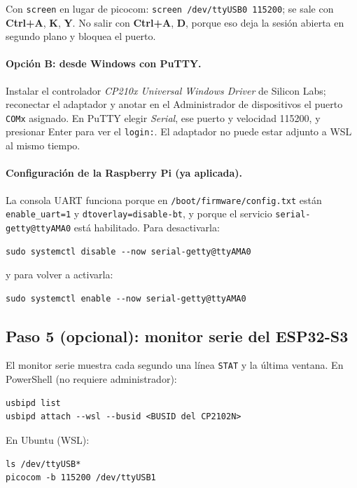 \documentclass[12pt,a4paper]{article}
\begin{document}
Con \texttt{screen} en lugar de picocom: \texttt{screen /dev/ttyUSB0 115200}; se sale con \textbf{Ctrl+A}, \textbf{K}, \textbf{Y}. No salir con \textbf{Ctrl+A}, \textbf{D}, porque eso deja la sesión abierta en segundo plano y bloquea el puerto.

\paragraph{Opción B: desde Windows con PuTTY.} Instalar el controlador \emph{CP210x Universal Windows Driver} de Silicon Labs; reconectar el adaptador y anotar en el Administrador de dispositivos el puerto \texttt{COMx} asignado. En PuTTY elegir \emph{Serial}, ese puerto y velocidad 115200, y presionar Enter para ver el \texttt{login:}. El adaptador no puede estar adjunto a WSL al mismo tiempo.

\paragraph{Configuración de la Raspberry Pi (ya aplicada).} La consola UART funciona porque en \texttt{/boot/firmware/config.txt} están \texttt{enable\_uart=1} y \texttt{dtoverlay=disable-bt}, y porque el servicio \texttt{serial-getty@ttyAMA0} está habilitado. Para desactivarla:
\begin{verbatim}
sudo systemctl disable --now serial-getty@ttyAMA0
\end{verbatim}
y para volver a activarla:
\begin{verbatim}
sudo systemctl enable --now serial-getty@ttyAMA0
\end{verbatim}

\subsection{Paso 5 (opcional): monitor serie del ESP32-S3}

El monitor serie muestra cada segundo una línea \texttt{STAT} y la última ventana. En PowerShell (no requiere administrador):

\begin{verbatim}
usbipd list
usbipd attach --wsl --busid <BUSID del CP2102N>
\end{verbatim}

En Ubuntu (WSL):

\begin{verbatim}
ls /dev/ttyUSB*
picocom -b 115200 /dev/ttyUSB1
\end{verbatim}
\end{document}
